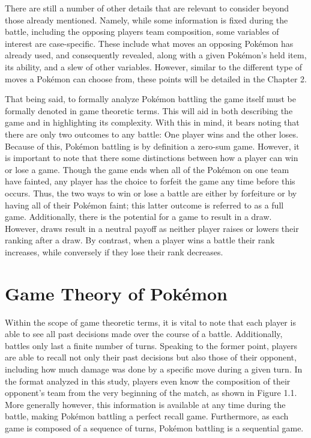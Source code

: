 \documentclass[12pt,twoside]{reedthesis}
\begin{document}
  There are still a number of other details that are relevant to consider
  beyond those already mentioned. Namely, while some information is fixed
  during the battle, including the opposing players team composition, some
  variables of interest are case-specific. These include what moves an
  opposing Pokémon has already used, and consequently revealed, along with
  a given Pokémon's held item, its ability, and a slew of other variables.
  However, similar to the different type of moves a Pokémon can choose
  from, these points will be detailed in the Chapter 2.
  
  That being said, to formally analyze Pokémon battling the game itself
  must be formally denoted in game theoretic terms. This will aid in both
  describing the game and in highlighting its complexity. With this in
  mind, it bears noting that there are only two outcomes to any battle:
  One player wins and the other loses. Because of this, Pokémon battling
  is by definition a zero-sum game. However, it is important to note that
  there some distinctions between how a player can win or lose a game.
  Though the game ends when all of the Pokémon on one team have fainted,
  any player has the choice to forfeit the game any time before this
  occurs. Thus, the two ways to win or lose a battle are either by
  forfeiture or by having all of their Pokémon faint; this latter outcome
  is referred to as a full game. Additionally, there is the potential for
  a game to result in a draw. However, draws result in a neutral payoff as
  neither player raises or lowers their ranking after a draw. By contrast,
  when a player wins a battle their rank increases, while conversely if
  they lose their rank decreases.
  
  \section{Game Theory of Pokémon}\label{game-theory-of-pokemon}
  
  Within the scope of game theoretic terms, it is vital to note that each
  player is able to see all past decisions made over the course of a
  battle. Additionally, battles only last a finite number of turns.
  Speaking to the former point, players are able to recall not only their
  past decisions but also those of their opponent, including how much
  damage was done by a specific move during a given turn. In the format
  analyzed in this study, players even know the composition of their
  opponent's team from the very beginning of the match, as shown in Figure
  1.1. More generally however, this information is available at any time
  during the battle, making Pokémon battling a perfect recall game.
  Furthermore, as each game is composed of a sequence of turns, Pokémon
  battling is a sequential game.
  
\end{document}
